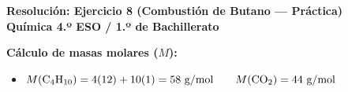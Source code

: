 ﻿\documentclass[11pt,a4paper]{article}
\begin{document}
\newpage

\begin{center}
    {\LARGE \textbf{Resolución: Ejercicio 8 (Combustión de Butano — Práctica)}}\\[4pt]
    {\large \textbf{Química 4.º ESO / 1.º de Bachillerato}}
\end{center}

\vspace{0.3cm}
\noindent\textbf{Cálculo de masas molares ($M$):}
\begin{itemize}[leftmargin=1.5em, itemsep=2pt]
    \item $M(\ce{C4H10}) = 4(12) + 10(1) = 58\text{ g/mol} \qquad M(\ce{CO2}) = 44\text{ g/mol}$
\end{itemize}
\end{document}
